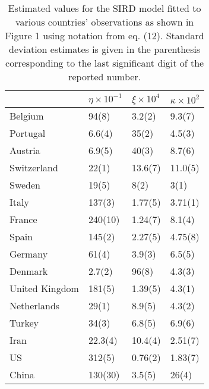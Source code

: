 \documentclass{article}
\newcommand{\insertPdfFig}[3]{
  \begin{figure}[H]
  \centering
  \texttt{[image: \#1.pdf]}
  \caption{#2}
  \label{fig:#1}
  \end{figure}
}
\begin{document}

\begin{table}
\label{tab:sird}
\centering
\caption{Estimated values for the SIRD model fitted to various countries' observations as shown in Figure 1 using notation from eq. (12). Standard deviation estimates is given in the parenthesis corresponding to the last significant digit of the reported number.}
\begin{tabular}{llll}
\toprule
{} &           $\eta\times 10^{-1}$ &      $\xi \times 10^{4}$ &            $\kappa\times 10^{2}$ \\
\midrule
Belgium        &    94(8) &   3.2(2) &   9.3(7) \\
Portugal       &   6.6(4) &    35(2) &   4.5(3) \\
Austria        &   6.9(5) &    40(3) &   8.7(6) \\
Switzerland    &    22(1) &  13.6(7) &  11.0(5) \\
Sweden         &    19(5) &     8(2) &     3(1) \\
Italy          &   137(3) &  1.77(5) &  3.71(1) \\
France         &  240(10) &  1.24(7) &   8.1(4) \\
Spain          &   145(2) &  2.27(5) &  4.75(8) \\
Germany        &    61(4) &   3.9(3) &   6.5(5) \\
Denmark        &   2.7(2) &    96(8) &   4.3(3) \\
United Kingdom &   181(5) &  1.39(5) &   4.3(1) \\
Netherlands    &    29(1) &   8.9(5) &   4.3(2) \\
Turkey         &    34(3) &   6.8(5) &   6.9(6) \\
Iran           &  22.3(4) &  10.4(4) &  2.51(7) \\
US             &   312(5) &  0.76(2) &  1.83(7) \\
China          &  130(30) &   3.5(5) &    26(4) \\
\bottomrule
\end{tabular}

\end{table}
\end{document}

